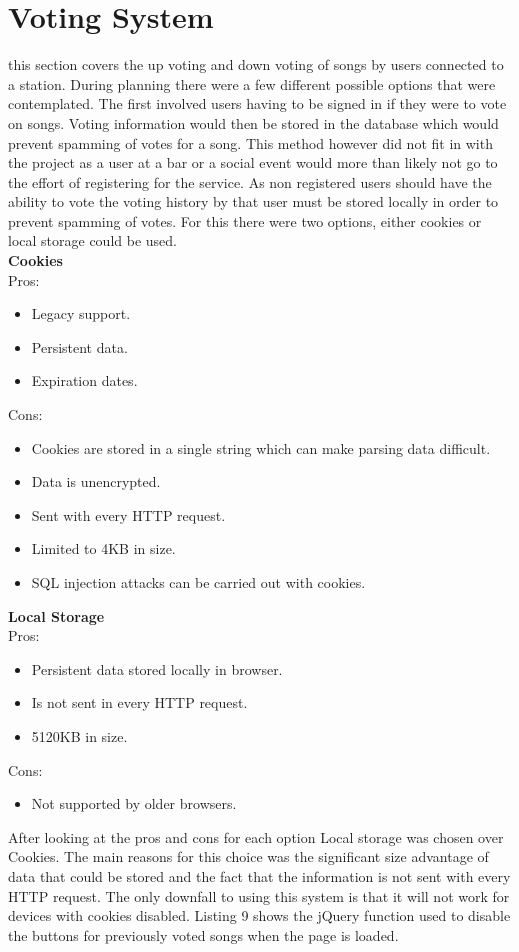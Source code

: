 \documentclass[a4paper, 12pt]{report}
\begin{document}
\section{Voting System}
this section covers the up voting and down voting of songs by users connected to a station. During planning there were a few different possible options that were contemplated. The first involved users having to be signed in if they were to vote on songs. Voting information would then be stored in the database which would prevent spamming of votes for a song. This method however did not fit in with the project as a user at a bar or a social event would more than likely not go to the effort of registering for the service. 
As non registered users should have the ability to vote the voting history by that user must be stored locally in order to prevent spamming of votes. For this there were two options, either cookies\cite{cookies} or local storage\cite{LS} could be used.\\
\textbf{Cookies}\\
Pros:
\begin{itemize}
 \item Legacy support.
 \item Persistent data.
 \item Expiration dates.
\end{itemize} 
Cons:
\begin{itemize}
\item Cookies are stored in a single string which can make parsing data difficult.
\item Data is unencrypted.
\item Sent with every HTTP request.
\item Limited to 4KB in size.
\item SQL injection attacks can be carried out with cookies.
\end{itemize}
\vskip1cm
\textbf{Local Storage}\\
Pros:
\begin{itemize}
 \item Persistent data stored locally in browser.
 \item Is not sent in every HTTP request.
 \item 5120KB in size.
\end{itemize} 
Cons:
\begin{itemize}
\item Not supported by older browsers.
\end{itemize}
\vskip1cm
After looking at the pros and cons for each option Local storage was chosen over Cookies. The main reasons for this choice was the significant size advantage of data that could be stored and the fact that the information is not sent with every HTTP request. The only downfall to using this system is that it will not work for devices with cookies disabled. Listing 9 shows the jQuery function used to disable the buttons for previously voted songs when the page is loaded.
\end{document}
